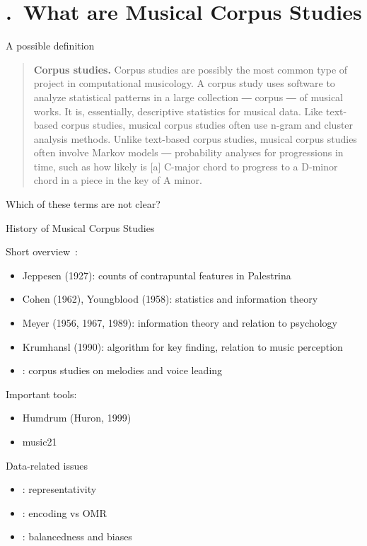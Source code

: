 \section{\thesection.~What are Musical Corpus Studies}

\begin{frame}{A possible definition}
    \begin{quote}
        \textbf{Corpus studies.} Corpus studies are possibly the most common type of project in
        \alert{computational musicology}. A corpus study uses \alert{software} to analyze \alert{statistical patterns}
        in a large collection ― corpus ― of \alert{musical works}. It is, essentially, descriptive statistics
        for musical data. Like text-based corpus studies, musical corpus studies 
        often use \alert{n-gram} and \alert{cluster analysis} methods. 
        Unlike text-based corpus studies, musical corpus
        studies often involve \alert{Markov models} ― probability analyses for progressions in time,
        such as how likely is [a] C-major chord to progress to a D-minor chord in a piece in the
        key of A minor.~\citep{Schaffer2016}
    \end{quote}

    \pause

    Which of these terms are not clear?
\end{frame}

\begin{frame}{History of Musical Corpus Studies}

    Short overview~\citep[after][]{Temperley2013a}:
    \begin{itemize}
        \item Jeppesen (1927): counts of contrapuntal features in Palestrina
        \item Cohen (1962), Youngblood (1958): statistics and information theory 
        \item Meyer (1956, 1967, 1989): information theory and relation to psychology
        \item Krumhansl (1990): algorithm for key finding, relation to music perception
        \item \citet{Huron2001,Huron2006,Huron2016}: corpus studies on melodies and voice leading
    \end{itemize}

    \pause

    Important tools:
    \begin{itemize}
        \item Humdrum (Huron, 1999)
        \item music21 \citep{Cuthbert2010}
    \end{itemize}
\end{frame}

\begin{frame}{Data-related issues}

    \begin{itemize}
        \item \citet{London2013}: representativity
        \item \citet{Pugin2015}: encoding vs OMR
        \item \citet{Neuwirth2018}: balancedness and biases
    \end{itemize}
    
\end{frame}